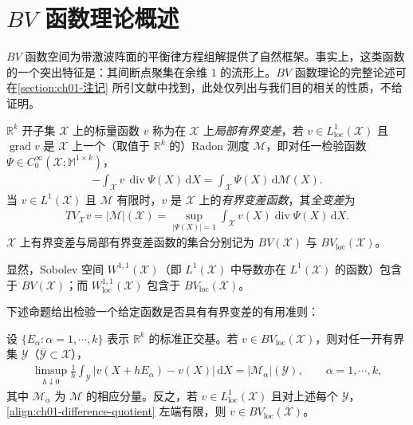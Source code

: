 \documentclass[../../main.tex]{subfiles}
\begin{document}
\section{$BV$ 函数理论概述}\label{section:ch01-BV函数理论概述}

$BV$ 函数空间为带激波阵面的平衡律方程组解提供了自然框架。事实上，这类函数的一个突出特征是：其间断点聚集在余维 $1$ 的流形上。$BV$ 函数理论的完整论述可在\cref{section:ch01-注记} 所引文献中找到，此处仅列出与我们目的相关的性质，不给证明。

\begin{definition}\label{definition:ch01-局部BV}
$\mathbb{R}^{k}$ 开子集 $\mathscr{X}$ 上的标量函数 $v$ 称为在 $\mathscr{X}$ 上\emph{局部有界变差}，若 $v\in L^{1}_{\mathrm{loc}}(\mathscr{X})$ 且 $\operatorname{grad}v$ 是 $\mathscr{X}$ 上一个（取值于 $\mathbb{R}^{k}$ 的）Radon 测度 $\mathscr{M}$，即对任一检验函数 $\Psi\in C_{0}^{\infty}(\mathscr{X};\mathbb{M}^{1\times k})$，
\begin{align}
-\int_{\mathscr{X}}v\,\operatorname{div}\Psi(X)\,\mathrm{d}X=\int_{\mathscr{X}}\Psi(X)\,\mathrm{d}\mathscr{M}(X).\label{align:ch01-BV-def}
\end{align}
当 $v\in L^{1}(\mathscr{X})$ 且 $\mathscr{M}$ 有限时，$v$ 是 $\mathscr{X}$ 上的\emph{有界变差函数}，其\emph{全变差}为
\begin{align}
TV_{\mathscr{X}}v=|\mathscr{M}|(\mathscr{X})=\sup_{|\Psi(X)|=1}\int_{\mathscr{X}}v(X)\operatorname{div}\Psi(X)\,\mathrm{d}X.\label{align:ch01-total-variation}
\end{align}
$\mathscr{X}$ 上有界变差与局部有界变差函数的集合分别记为 $BV(\mathscr{X})$ 与 $BV_{\mathrm{loc}}(\mathscr{X})$。
\end{definition}

显然，Sobolev 空间 $W^{1,1}(\mathscr{X})$（即 $L^{1}(\mathscr{X})$ 中导数亦在 $L^{1}(\mathscr{X})$ 的函数）包含于 $BV(\mathscr{X})$；而 $W^{1,1}_{\mathrm{loc}}(\mathscr{X})$ 包含于 $BV_{\mathrm{loc}}(\mathscr{X})$。

下述命题给出检验一个给定函数是否具有有界变差的有用准则：

\begin{theorem}\label{theorem:ch01-差商准则}
设 $\{E_{\alpha}:\alpha=1,\cdots,k\}$ 表示 $\mathbb{R}^{k}$ 的标准正交基。若 $v\in BV_{\mathrm{loc}}(\mathscr{X})$，则对任一开有界集 $\mathscr{Y}$（$\overline{\mathscr{Y}}\subset\mathscr{X}$），
\begin{align}
\limsup_{h\downarrow 0}\frac{1}{h}\int_{\mathscr{Y}}|v(X+hE_{\alpha})-v(X)|\,\mathrm{d}X=|\mathscr{M}_{\alpha}|(\mathscr{Y}),\qquad \alpha=1,\cdots,k,\label{align:ch01-difference-quotient}
\end{align}
其中 $\mathscr{M}_{\alpha}$ 为 $\mathscr{M}$ 的相应分量。反之，若 $v\in L^{1}_{\mathrm{loc}}(\mathscr{X})$ 且对上述每个 $\mathscr{Y}$，\cref{align:ch01-difference-quotient} 左端有限，则 $v\in BV_{\mathrm{loc}}(\mathscr{X})$。
\end{theorem}
\end{document}
